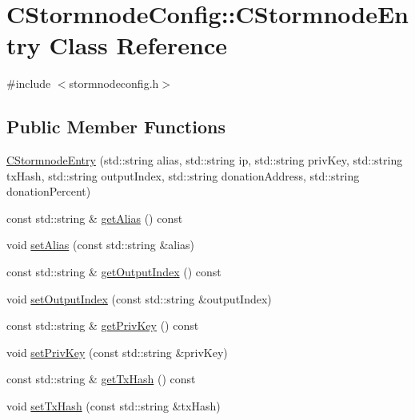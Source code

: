 \hypertarget{class_c_stormnode_config_1_1_c_stormnode_entry}{}\section{C\+Stormnode\+Config\+:\+:C\+Stormnode\+Entry Class Reference}
\label{class_c_stormnode_config_1_1_c_stormnode_entry}


{\ttfamily \#include $<$stormnodeconfig.\+h$>$}

\subsection*{Public Member Functions}
\begin{DoxyCompactItemize}
\item 
\hyperlink{class_c_stormnode_config_1_1_c_stormnode_entry_ac9933a3a0f7507210f4008659ace26a4}{C\+Stormnode\+Entry} (std\+::string alias, std\+::string ip, std\+::string priv\+Key, std\+::string tx\+Hash, std\+::string output\+Index, std\+::string donation\+Address, std\+::string donation\+Percent)
\item 
const std\+::string \& \hyperlink{class_c_stormnode_config_1_1_c_stormnode_entry_ae6bc0007a5896e6edd061bca02251dbf}{get\+Alias} () const 
\item 
void \hyperlink{class_c_stormnode_config_1_1_c_stormnode_entry_a354a4f052a74acd3ac79121826bd547c}{set\+Alias} (const std\+::string \&alias)
\item 
const std\+::string \& \hyperlink{class_c_stormnode_config_1_1_c_stormnode_entry_ab46bd1124cbb3b970e58e306ffe799ae}{get\+Output\+Index} () const 
\item 
void \hyperlink{class_c_stormnode_config_1_1_c_stormnode_entry_a3bd7ff5994a989c6d7faeaee9094a556}{set\+Output\+Index} (const std\+::string \&output\+Index)
\item 
const std\+::string \& \hyperlink{class_c_stormnode_config_1_1_c_stormnode_entry_a02796f15b7991ec6682193b211353265}{get\+Priv\+Key} () const 
\item 
void \hyperlink{class_c_stormnode_config_1_1_c_stormnode_entry_a7dab10d3e21274480bec45db237413c0}{set\+Priv\+Key} (const std\+::string \&priv\+Key)
\item 
const std\+::string \& \hyperlink{class_c_stormnode_config_1_1_c_stormnode_entry_a96b1b54ab8cd92c2fa1bd22834963512}{get\+Tx\+Hash} () const 
\item 
void \hyperlink{class_c_stormnode_config_1_1_c_stormnode_entry_acf630eabd8b4977a1de3354e537c9fa7}{set\+Tx\+Hash} (const std\+::string \&tx\+Hash)

\end{DoxyCompactItemize}
